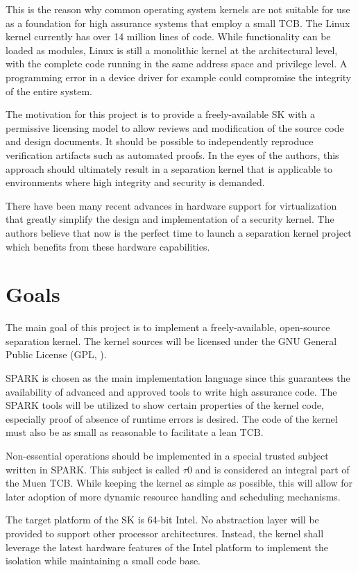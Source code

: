 This is the reason why common operating system kernels are not suitable for use
as a foundation for high assurance systems that employ a small TCB. The
Linux kernel currently has over 14 million lines of code. While
functionality can be loaded as modules, Linux is still a
monolithic kernel at the architectural level, with the
complete code running in the same address space and privilege level. A
programming error in a device driver for example could compromise the integrity
of the entire system.

The motivation for this project is to provide a freely-available SK with a
permissive licensing model to allow reviews and modification of
the source code and design documents. It should be possible to independently
reproduce verification artifacts such as automated proofs. In the eyes of the
authors, this approach should ultimately result in a separation kernel that is
applicable to environments where high integrity and security is demanded.

There have been many recent advances in hardware support for virtualization
that greatly simplify the design and implementation of a security kernel. The
authors believe that now is the perfect time to launch a separation kernel
project which benefits from these hardware capabilities.

\section{Goals}
The main goal of this project is to implement a freely-available, open-source
separation kernel. The kernel sources will be licensed under the GNU General
Public License (GPL, \cite{gpl}).

SPARK is chosen as the main implementation language since this guarantees the
availability of advanced and approved tools to write high assurance code. The
SPARK tools will be utilized to show certain properties of the kernel code,
especially proof of absence of runtime errors is desired. The code of the kernel
must also be as small as reasonable to facilitate a lean TCB.

Non-essential operations should be implemented in a special trusted subject
written in SPARK. This subject is called $\tau$0 and is considered an
integral part of the Muen TCB. While keeping the kernel as simple as possible,
this will allow for later adoption of more dynamic resource handling and
scheduling mechanisms.

The target platform of the SK is 64-bit Intel. No abstraction layer will be
provided to support other processor architectures. Instead, the kernel shall
leverage the latest hardware features of the Intel platform to implement the
isolation while maintaining a small code base.

